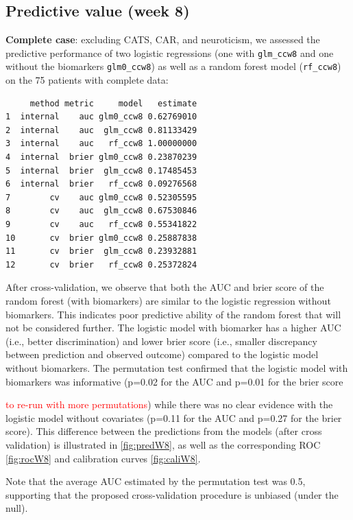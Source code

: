 \documentclass[12pt]{article}
\newcommand\Warning[1][3ex]{%
\renewcommand\stacktype{L}%
\scaleto{\stackon[1.3pt]{\color{red}$\triangle$}{\tiny\bfseries !}}{#1}%
\xspace
}
\begin{document}
\subsection{Predictive value (week 8)}
\label{sec:org68ddcb4}

\textbf{Complete case}: excluding CATS, CAR, and neuroticism, we assessed the
predictive performance of two logistic regressions (one with
\texttt{glm\_ccw8} and one without the biomarkers \texttt{glm0\_ccw8}) as well as a
random forest model (\texttt{rf\_ccw8}) on the 75 patients with complete data:
\begin{verbatim}
     method metric     model   estimate
1  internal    auc glm0_ccw8 0.62769010
2  internal    auc  glm_ccw8 0.81133429
3  internal    auc   rf_ccw8 1.00000000
4  internal  brier glm0_ccw8 0.23870239
5  internal  brier  glm_ccw8 0.17485453
6  internal  brier   rf_ccw8 0.09276568
7        cv    auc glm0_ccw8 0.52305595
8        cv    auc  glm_ccw8 0.67530846
9        cv    auc   rf_ccw8 0.55341822
10       cv  brier glm0_ccw8 0.25887838
11       cv  brier  glm_ccw8 0.23932881
12       cv  brier   rf_ccw8 0.25372824
\end{verbatim}

After cross-validation, we observe that both the AUC and brier score
of the random forest (with biomarkers) are similar to the logistic
regression without biomarkers. This indicates poor predictive ability
of the random forest that will not be considered further. The logistic
model with biomarker has a higher AUC (i.e., better discrimination)
and lower brier score (i.e., smaller discrepancy between prediction
and observed outcome) compared to the logistic model without
biomarkers. The permutation test confirmed that the logistic model
with biomarkers was informative (p=0.02 for the AUC and p=0.01 for the
brier score \Warning \textcolor{red}{to re-run with more
permutations}) while there was no clear evidence with the logistic
model without covariates (p=0.11 for the AUC and p=0.27 for the brier
score). This difference between the predictions from the models (after
cross validation) is illustrated in \autoref{fig:predW8}, as well as
the corresponding ROC \autoref{fig:rocW8} and calibration curves
\autoref{fig:caliW8}.

\bigskip

Note that the average AUC estimated by the permutation test was 0.5,
supporting that the proposed cross-validation procedure is unbiased
(under the null).

\clearpage
\end{document}
